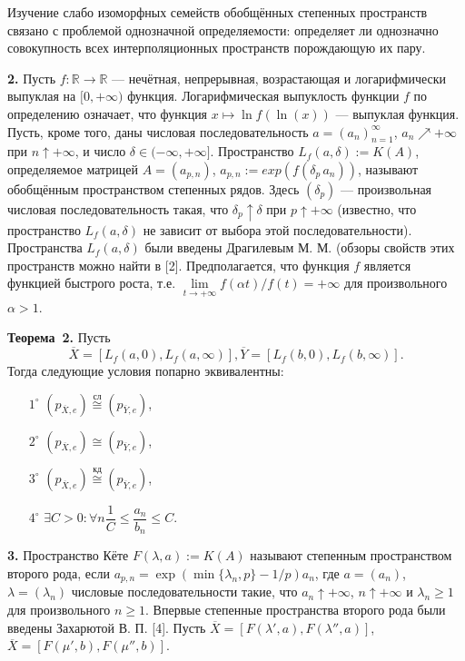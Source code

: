 \documentclass{vzmsthesis}
\begin{document}
Изучение слабо изоморфных семейств обобщённых степенных про\-ст\-ранств связано с проблемой однозначной
определяемости: определяет ли однозначно совокупность всех интерполяционных пространств
порождающую их пару.

{\bf 2. }Пусть $f:{\mathbb R}\to{\mathbb R}$ --- нечётная, непрерывная, возрастающая и логарифмически выпуклая
на $[0,+\infty )$ функция. Логарифмическая выпуклость функции $f$  по определению означает, что функция
$x\mapsto \ln f(\ln(x))$ --- выпуклая функция. Пусть, кроме того, даны числовая последовательность
$a=(a_{n})_{n=1}^{\infty }$, $a_n\nearrow +\infty $ при $n\uparrow +\infty $,
и число $\delta \in (-\infty ,+\infty ]$.   Пространство $L_{f}(a,\delta ):=K(A)$,  определяемое
матрицей $A=(a_{p,n})$, $a_{p,n}:= exp (f(\delta_p\, a_n))$,
называют обобщённым пространством степенных рядов.
Здесь $(\delta_p)$ --- произвольная
числовая последовательность такая, что $\delta_p \uparrow \delta  $ при $p\uparrow +\infty $
(известно, что пространство $L_{f}(a,\delta )$ не зависит от выбора этой последовательности). Пространства $L_{f}(a,\delta )$
были введены Драгилевым М. М. (обзоры свойств этих пространств можно найти в [2].
Предполагается, что функция $f$ является функцией быстрого роста, т.е.
$\lim\limits_{t\to +\infty }f(\alpha t)/f(t)=+\infty $ для произвольного $\alpha >1$.

\noindent\textbf{Теорема~2.}
Пусть 
$$
\overline{X}=[L_{f}(a,0),L_{f}(a,\infty )], \overline{Y}=[L_{f}(b,0),L_{f}(b,\infty )].
$$
Тогда следующие условия попарно эквивалентны:
\begin{itemize}
\item[$1^{\circ}$] $(p_{\overline{X},e})\stackrel{\text{сл}}{\cong}(p_{\overline{Y},e})$,
\item[$2^{\circ}$] $(p_{\overline{X},e})\cong(p_{\overline{Y},e})$,
\item[$3^{\circ}$] $(p_{\overline{X},e})\stackrel{\text{кд}}{\cong}(p_{\overline{Y},e})$,
\item[$4^{\circ}$] $\exists{C>0:}\forall{n} \dfrac{1}{C}\leqslant \dfrac{a_{n}}{b_{n}}\leqslant C$.
\end{itemize}

{\bf 3. }Пространство Кёте $F(\lambda ,a):=K(A)$ называют степенным пространством второго рода, если
$a_{p,n}=\exp(\min\{\lambda_n,p \}-1/p)a_{n}$, где $a=(a_n)$, $\lambda=(\lambda_n)$ числовые
последовательности такие, что $a_n\uparrow +\infty $, $n\uparrow +\infty $ и $\lambda_n\geqslant 1$ для
произвольного $n\geqslant 1$. Впервые степенные пространства
второго рода были введены Захарютой В. П. [4].
Пусть $\overline{X}=[F(\lambda',a),F(\lambda'',a)]$, $\overline{X}=[F(\mu',b),F(\mu'',b)]$.
\end{document}
